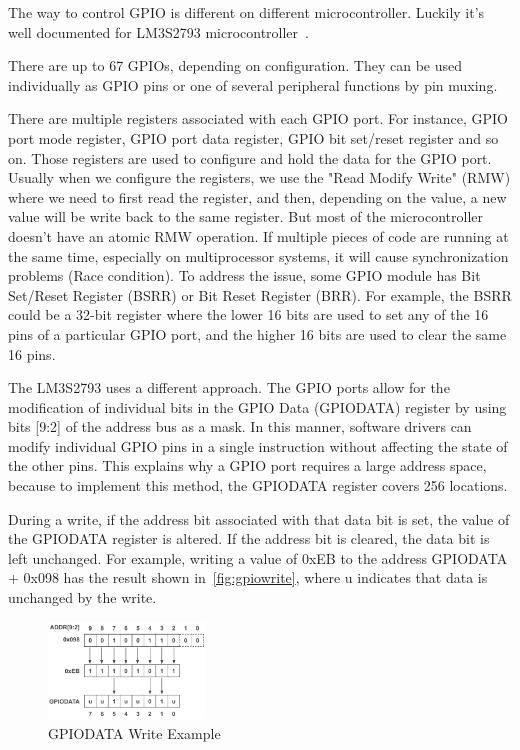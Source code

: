The way to control GPIO is different on different microcontroller. Luckily it's well documented for LM3S2793 microcontroller~\cite{lm3s2793}. 

There are up to 67 GPIOs, depending on configuration. They can be used individually as GPIO pins or one of several peripheral functions by pin muxing.

There are multiple registers associated with each GPIO port. For instance, GPIO port mode register, GPIO port data register, GPIO bit set/reset register and so on. Those registers are used to configure and hold the data for the GPIO port. Usually when we configure the registers, we use the "Read Modify Write" (RMW) where we need to first read the register, and then, depending on the value, a new value will be write back to the same register. But most of the microcontroller doesn't have an atomic RMW operation. If multiple pieces of code are running at the same time, especially on multiprocessor systems, it will cause synchronization problems (Race condition). To address the issue, some GPIO module has Bit Set/Reset Register (BSRR) or Bit Reset Register (BRR). For example, the BSRR could be a 32-bit register where the lower 16 bits are used to set any of the 16 pins of a particular GPIO port, and the higher 16 bits are used to clear the same 16 pins.

The LM3S2793 uses a different approach. The GPIO ports allow for the modification of individual bits in the GPIO Data (GPIODATA) register by using bits [9:2] of the address bus as a mask. In this manner, software drivers can modify individual GPIO pins in a single instruction without affecting the state of the other pins. This explains why a GPIO port requires a large address space, because to implement this method, the GPIODATA register covers 256 locations. 

During a write, if the address bit associated with that data bit is set, the value of the GPIODATA register is altered. If the address bit is cleared, the data bit is left unchanged. For example, writing a value of 0xEB to the address GPIODATA + 0x098 has the result shown in~\autoref{fig:gpiowrite}, where u indicates that data is unchanged by the write. 

\begin{figure}[th]
	\includegraphics[width=0.37\textwidth]{figures/gpiowrite}
	\centering
	\caption{GPIODATA Write Example~\cite{lm3s2793}}
	\label{fig:gpiowrite}
\end{figure}

